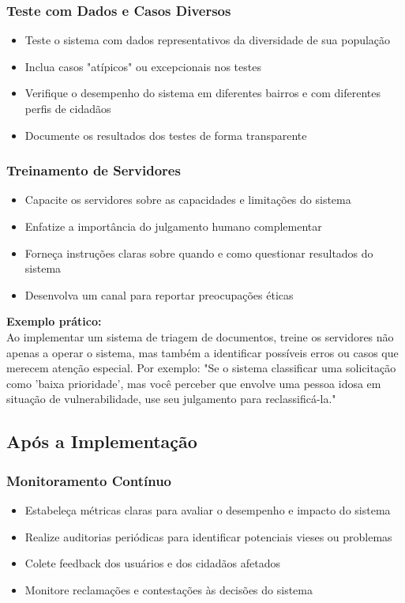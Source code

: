\documentclass[12pt,a4paper]{article}
\begin{document}
\subsubsection{Teste com Dados e Casos Diversos}
\begin{itemize}
    \item Teste o sistema com dados representativos da diversidade de sua população
    \item Inclua casos "atípicos" ou excepcionais nos testes
    \item Verifique o desempenho do sistema em diferentes bairros e com diferentes perfis de cidadãos
    \item Documente os resultados dos testes de forma transparente
\end{itemize}

\subsubsection{Treinamento de Servidores}
\begin{itemize}
    \item Capacite os servidores sobre as capacidades e limitações do sistema
    \item Enfatize a importância do julgamento humano complementar
    \item Forneça instruções claras sobre quando e como questionar resultados do sistema
    \item Desenvolva um canal para reportar preocupações éticas
\end{itemize}

\begin{tcolorbox}[example]
\textbf{Exemplo prático:} \\
Ao implementar um sistema de triagem de documentos, treine os servidores não apenas a operar o sistema, mas também a identificar possíveis erros ou casos que merecem atenção especial. Por exemplo: "Se o sistema classificar uma solicitação como 'baixa prioridade', mas você perceber que envolve uma pessoa idosa em situação de vulnerabilidade, use seu julgamento para reclassificá-la."
\end{tcolorbox}

\subsection{Após a Implementação}

\subsubsection{Monitoramento Contínuo}
\begin{itemize}
    \item Estabeleça métricas claras para avaliar o desempenho e impacto do sistema
    \item Realize auditorias periódicas para identificar potenciais vieses ou problemas
    \item Colete feedback dos usuários e dos cidadãos afetados
    \item Monitore reclamações e contestações às decisões do sistema
\end{itemize}
\end{document}
